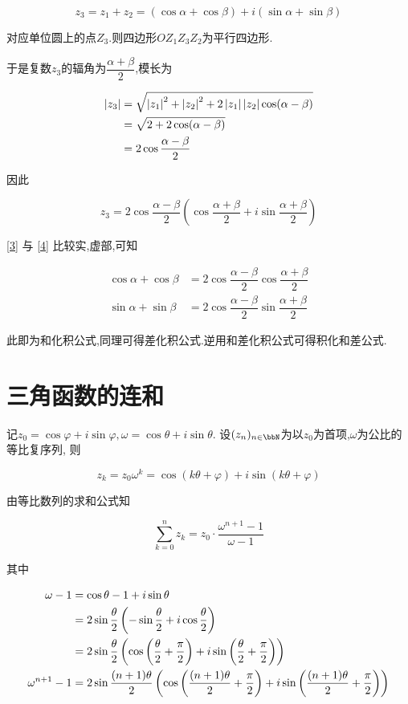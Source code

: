 \documentclass{article}
\begin{document}
\begin{equation} z_3 = z_1 + z_2 = (\cos \alpha + \cos \beta) + i (\sin \alpha + \sin \beta) \label{3} \end{equation}

对应单位圆上的点$Z_3$.则四边形$OZ_1Z_3Z_2$为平行四边形.

于是复数$z_3$的辐角为$\dfrac{\alpha + \beta}{2}$,模长为

\begin{align*}
    \left\lvert z_3 \right\rvert & = \sqrt{\left\lvert z_1 \right\rvert^2 + \left\lvert z_2 \right\rvert^2 + 2 \left\lvert z_1 \right\rvert \left\lvert z_2 \right\rvert \cos (\alpha - \beta)} \\
    & = \sqrt{2 + 2 \cos (\alpha - \beta)} \\
    & = 2 \cos \dfrac{\alpha - \beta}{2}
\end{align*}

因此

\begin{equation}
    z_3 = 2 \cos \dfrac{\alpha - \beta}{2} \left(  \cos \dfrac{\alpha + \beta}{2} + i \sin \dfrac{\alpha + \beta}{2} \right) \label{4}
\end{equation}

\eqref{3} 与 \eqref{4} 比较实,虚部,可知

\begin{align*}
    \cos \alpha + \cos \beta & = 2 \cos \dfrac{\alpha - \beta}{2} \cos \dfrac{\alpha + \beta}{2} \\
    \sin \alpha + \sin \beta & = 2 \cos \dfrac{\alpha - \beta}{2} \sin \dfrac{\alpha + \beta}{2}
\end{align*}

此即为和化积公式,同理可得差化积公式.逆用和差化积公式可得积化和差公式.

\section{三角函数的连和}

记$z_0 = \cos \varphi + i \sin \varphi, \omega = \cos \theta + i \sin \theta$.
设$(z_n)_{n \in \bbN}$为以$z_0$为首项,$\omega$为公比的等比复序列,
则 \par \[ z_k = z_0 \omega^k = \cos (k \theta + \varphi) + i \sin (k \theta + \varphi) \]
\par 由等比数列的求和公式知 \par \[ \sum\limits_{k = 0}^n z_k = z_0 \cdot \dfrac{\omega^{n + 1} - 1}{\omega - 1} \] \par 其中

\begin{align*}
    \omega - 1 & = \cos \theta - 1 + i \sin \theta \notag \\
    & = 2 \sin \dfrac{\theta}{2} \left( -\sin \dfrac{\theta}{2} + i \cos \dfrac{\theta}{2} \right) \notag \\
    & = 2 \sin \dfrac{\theta}{2} \left( \cos \left( \dfrac{\theta}{2} + \dfrac{\pi}{2} \right) +
        i \sin \left( \dfrac{\theta}{2} + \dfrac{\pi}{2} \right) \right) \\
    \omega^{n + 1} - 1 & = 2 \sin \dfrac{(n + 1) \theta}{2} \left( \cos \left( \dfrac{(n + 1) \theta}{2} +
        \dfrac{\pi}{2} \right) + i \sin \left( \dfrac{(n + 1) \theta}{2} + \dfrac{\pi}{2} \right) \right)
\end{align*}
\end{document}
